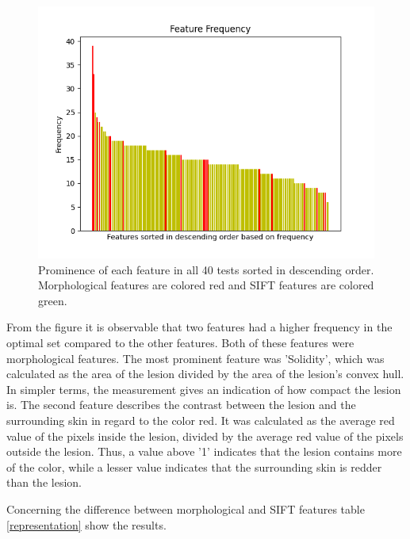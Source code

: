 \documentclass{kththesis}
\begin{document}



\begin{figure}[h!]
  \centering
  \includegraphics[scale=0.8]{./figures/Figure_all_fres.png}
  \caption{Prominence of each feature in all 40 tests sorted in descending order. Morphological features are colored red and SIFT features are colored green.}
  \label{fig:all_freq}
\end{figure}

\newpage

From the figure it is observable that two features had a higher frequency in the optimal set compared to the other features. Both of these features were morphological features. The most prominent feature was 'Solidity', which was calculated as the area of the lesion divided by the area of the lesion's convex hull. In simpler terms, the measurement gives an indication of how compact the lesion is. The second feature describes the contrast between the lesion and the surrounding skin in regard to the color red. It was calculated as the average red value of the pixels inside the lesion, divided by the average red value of the pixels outside the lesion. Thus, a value above '1' indicates that the lesion contains more of the color, while a lesser value indicates that the surrounding skin is redder than the lesion.

Concerning the difference between morphological and SIFT features table \ref{representation} show the results. 
\end{document}

